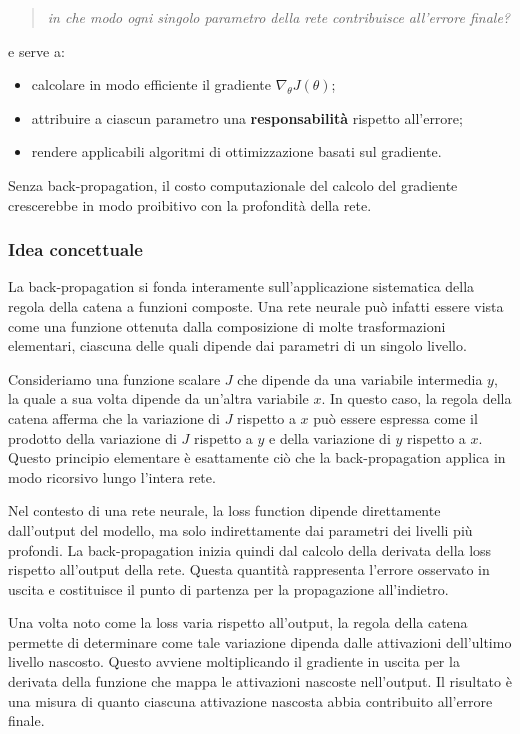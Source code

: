 \documentclass[a4paper,12pt]{report}
\begin{document}
\begin{quote}
\textit{in che modo ogni singolo parametro della rete contribuisce all’errore finale?}
\end{quote}

e serve a:
\begin{itemize}
    \item calcolare in modo efficiente il gradiente $\nabla_{\theta} J(\theta)$;
    \item attribuire a ciascun parametro una \textbf{responsabilità} rispetto all’errore;
    \item rendere applicabili algoritmi di ottimizzazione basati sul gradiente.
\end{itemize}

Senza back-propagation, il costo computazionale del calcolo del gradiente crescerebbe in modo proibitivo con la profondità della rete.

\subsubsection{Idea concettuale}

La back-propagation si fonda interamente sull’applicazione sistematica della regola della catena a funzioni composte.  
Una rete neurale può infatti essere vista come una funzione ottenuta dalla composizione di molte trasformazioni elementari, ciascuna delle quali dipende dai parametri di un singolo livello.

Consideriamo una funzione scalare $J$ che dipende da una variabile intermedia $y$, la quale a sua volta dipende da un’altra variabile $x$.  
In questo caso, la regola della catena afferma che la variazione di $J$ rispetto a $x$ può essere espressa come il prodotto della variazione di $J$ rispetto a $y$ e della variazione di $y$ rispetto a $x$.  
Questo principio elementare è esattamente ciò che la back-propagation applica in modo ricorsivo lungo l’intera rete.

Nel contesto di una rete neurale, la loss function dipende direttamente dall’output del modello, ma solo indirettamente dai parametri dei livelli più profondi.  
La back-propagation inizia quindi dal calcolo della derivata della loss rispetto all’output della rete.  
Questa quantità rappresenta l’errore osservato in uscita e costituisce il punto di partenza per la propagazione all’indietro.

Una volta noto come la loss varia rispetto all’output, la regola della catena permette di determinare come tale variazione dipenda dalle attivazioni dell’ultimo livello nascosto.  
Questo avviene moltiplicando il gradiente in uscita per la derivata della funzione che mappa le attivazioni nascoste nell’output.  
Il risultato è una misura di quanto ciascuna attivazione nascosta abbia contribuito all’errore finale.
\end{document}
